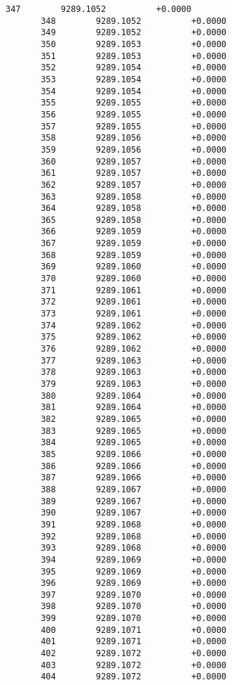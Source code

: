 \documentclass[11pt]{article}
\begin{document}
\begin{Verbatim}[commandchars=\\\{\}]
       347        9289.1052          +0.0000
       348        9289.1052          +0.0000
       349        9289.1052          +0.0000
       350        9289.1053          +0.0000
       351        9289.1053          +0.0000
       352        9289.1054          +0.0000
       353        9289.1054          +0.0000
       354        9289.1054          +0.0000
       355        9289.1055          +0.0000
       356        9289.1055          +0.0000
       357        9289.1055          +0.0000
       358        9289.1056          +0.0000
       359        9289.1056          +0.0000
       360        9289.1057          +0.0000
       361        9289.1057          +0.0000
       362        9289.1057          +0.0000
       363        9289.1058          +0.0000
       364        9289.1058          +0.0000
       365        9289.1058          +0.0000
       366        9289.1059          +0.0000
       367        9289.1059          +0.0000
       368        9289.1059          +0.0000
       369        9289.1060          +0.0000
       370        9289.1060          +0.0000
       371        9289.1061          +0.0000
       372        9289.1061          +0.0000
       373        9289.1061          +0.0000
       374        9289.1062          +0.0000
       375        9289.1062          +0.0000
       376        9289.1062          +0.0000
       377        9289.1063          +0.0000
       378        9289.1063          +0.0000
       379        9289.1063          +0.0000
       380        9289.1064          +0.0000
       381        9289.1064          +0.0000
       382        9289.1065          +0.0000
       383        9289.1065          +0.0000
       384        9289.1065          +0.0000
       385        9289.1066          +0.0000
       386        9289.1066          +0.0000
       387        9289.1066          +0.0000
       388        9289.1067          +0.0000
       389        9289.1067          +0.0000
       390        9289.1067          +0.0000
       391        9289.1068          +0.0000
       392        9289.1068          +0.0000
       393        9289.1068          +0.0000
       394        9289.1069          +0.0000
       395        9289.1069          +0.0000
       396        9289.1069          +0.0000
       397        9289.1070          +0.0000
       398        9289.1070          +0.0000
       399        9289.1070          +0.0000
       400        9289.1071          +0.0000
       401        9289.1071          +0.0000
       402        9289.1072          +0.0000
       403        9289.1072          +0.0000
       404        9289.1072          +0.0000

\end{Verbatim}
\end{document}

